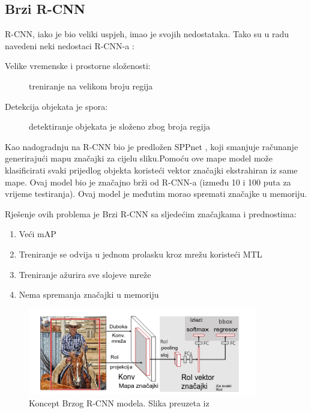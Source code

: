 \subsection{Brzi R-CNN}
R-CNN, iako je bio veliki uspjeh, imao je svojih nedostataka.
Tako su u radu \cite{DBLP:journals/corr/Girshick15} navedeni neki nedostaci R-CNN-a : 
\begin{description}
    \item [Velike vremenske i prostorne složenosti:]treniranje na velikom broju regija
    \item [Detekcija objekata je spora:]detektiranje objekata je složeno zbog broja regija
\end{description}
Kao nadogradnju na R-CNN bio je predložen SPPnet , koji smanjuje 
računanje generirajući mapu značajki za cijelu sliku.\newline Pomoću ove mape model može klasificirati svaki prijedlog objekta
koristeći vektor značajki ekstrahiran iz same mape.
Ovaj model bio je značajno brži od R-CNN-a (između 10 i 100 puta za vrijeme testiranja). Ovaj model je međutim morao spremati značajke u memoriju.\newline

Rješenje ovih problema je Brzi R-CNN sa sljedećim značajkama i prednostima:
\begin{enumerate}
    \item Veći mAP 
    \item Treniranje se odvija u jednom prolasku kroz mrežu koristeći MTL 
    \item Treniranje ažurira sve slojeve mreže
    \item Nema spremanja značajki u memoriju
\end{enumerate}

\begin{figure}[htb]
    \centering
    \includegraphics[width=10cm]{img/Fast-RCNN.png}
    \caption{Koncept Brzog R-CNN modela. Slika preuzeta iz \citep{DBLP:journals/corr/Girshick15}}
    \label{fig:Koncept Brzog R-CNN modela}
\end{figure}

